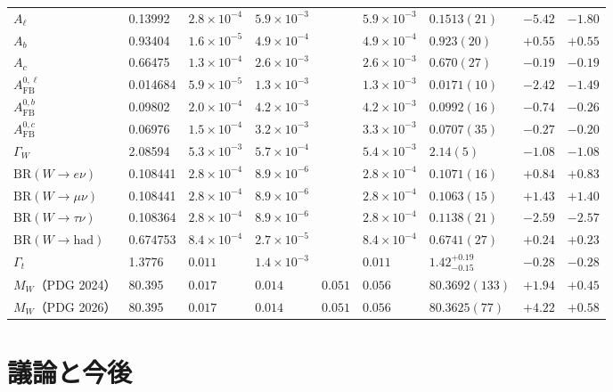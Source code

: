 \documentclass[a4paper,10pt]{ltjsarticle}
\begin{document}
\begin{table}[tbp]
\begin{tabular}{lllllllrr}
$A_\ell$ & 0.13992 & $2.8\times10^{-4}$ & $5.9\times10^{-3}$ & & $5.9\times10^{-3}$ & $0.1513(21)$ & $-5.42$ & $-1.80$ \\
$A_b$ & 0.93404 & $1.6\times10^{-5}$ & $4.9\times10^{-4}$ & & $4.9\times10^{-4}$ & $0.923(20)$ & $+0.55$ & $+0.55$ \\
$A_c$ & 0.66475 & $1.3\times10^{-4}$ & $2.6\times10^{-3}$ & & $2.6\times10^{-3}$ & $0.670(27)$ & $-0.19$ & $-0.19$ \\
$A^{0,\ell}_{\mathrm{FB}}$ & 0.014684 & $5.9\times10^{-5}$ & $1.3\times10^{-3}$ & & $1.3\times10^{-3}$ & $0.0171(10)$ & $-2.42$ & $-1.49$ \\
$A^{0,b}_{\mathrm{FB}}$ & 0.09802 & $2.0\times10^{-4}$ & $4.2\times10^{-3}$ & & $4.2\times10^{-3}$ & $0.0992(16)$ & $-0.74$ & $-0.26$ \\
$A^{0,c}_{\mathrm{FB}}$ & 0.06976 & $1.5\times10^{-4}$ & $3.2\times10^{-3}$ & & $3.3\times10^{-3}$ & $0.0707(35)$ & $-0.27$ & $-0.20$ \\
$\Gamma_W$ & 2.08594 & $5.3\times10^{-3}$ & $5.7\times10^{-4}$ & & $5.4\times10^{-3}$ & $2.14(5)$ & $-1.08$ & $-1.08$ \\
$\mathrm{BR}(W\to e\nu)$ & 0.108441 & $2.8\times10^{-4}$ & $8.9\times10^{-6}$ & & $2.8\times10^{-4}$ & $0.1071(16)$ & $+0.84$ & $+0.83$ \\
$\mathrm{BR}(W\to\mu\nu)$ & 0.108441 & $2.8\times10^{-4}$ & $8.9\times10^{-6}$ & & $2.8\times10^{-4}$ & $0.1063(15)$ & $+1.43$ & $+1.40$ \\
$\mathrm{BR}(W\to\tau\nu)$ & 0.108364 & $2.8\times10^{-4}$ & $8.9\times10^{-6}$ & & $2.8\times10^{-4}$ & $0.1138(21)$ & $-2.59$ & $-2.57$ \\
$\mathrm{BR}(W\to\mathrm{had})$ & 0.674753 & $8.4\times10^{-4}$ & $2.7\times10^{-5}$ & & $8.4\times10^{-4}$ & $0.6741(27)$ & $+0.24$ & $+0.23$ \\
$\Gamma_t$ & 1.3776 & $0.011$ & $1.4\times10^{-3}$ & & $0.011$ & $1.42^{+0.19}_{-0.15}$ & $-0.28$ & $-0.28$ \\
$M_W$（PDG 2024） & 80.395 & $0.017$ & $0.014$ & $0.051$ & $0.056$ & $80.3692(133)$ & $+1.94$ & $+0.45$ \\
$M_W$（PDG 2026） & 80.395 & $0.017$ & $0.014$ & $0.051$ & $0.056$ & $80.3625(77)$ & $+4.22$ & $+0.58$ \\
\bottomrule
\end{tabular}
\end{table}

\FloatBarrier
\section{議論と今後}\label{sec:discussion}
\end{document}
